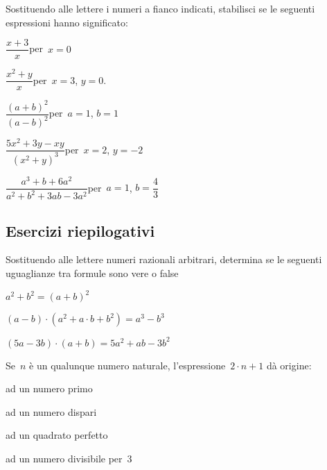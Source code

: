 \begin{esercizio}
 \label{ese:9.24}%
Sostituendo alle lettere i numeri a fianco indicati, stabilisci se le
seguenti espressioni hanno significato:
\TabPositions{8cm}
\begin{enumeratea}
\item $\dfrac{x+3}{x}$\quad per~$x=0$ \tab\boxSi\quad\boxNo
\item $\dfrac{x^{2}+y}{x}$\quad per~$x=3$, $y=0.$ \tab\boxSi\quad\boxNo
\item $\dfrac{(a+b)^{2}}{(a-b)^{2}}$\quad per~$a=1$, $b=1$ \tab\boxSi\quad\boxNo
\item $\dfrac{5x^{2}+3y-xy}{(x^{2}+y)^{3}}$\quad per~$x=2$, $y=-2$ \tab\boxSi\quad\boxNo
\item $\dfrac{a^{3}+b+6a^{2}}{a^{2}+b^{2}+3ab-3a^{2}}$\quad per~$a=1$, $b=\dfrac{4}{3}$ \tab\boxSi\quad\boxNo
\end{enumeratea}
\end{esercizio}

\subsection{Esercizi riepilogativi}

\begin{esercizio}
 \label{ese:9.25} %
 Sostituendo alle lettere numeri razionali
arbitrari, determina se le seguenti uguaglianze tra formule sono
vere o false
\TabPositions{8cm}
\begin{enumeratea}
 \item $a^{2}+b^{2}=(a+b)^{2}$ \tab\boxV\quad\boxF
 \item $(a-b)\cdot (a^{2}+a\cdot b+b^{2})=a^{3}-b^{3}$ \tab\boxV\quad\boxF
 \item $(5a-3b)\cdot (a+b)=5a^{2}+ab-3b^{2}$ \tab\boxV\quad\boxF
\end{enumeratea}
\end{esercizio}

\begin{esercizio}
 \label{ese:9.26} %
 Se~$n$ è un qualunque numero naturale,
l'espressione~$2\cdot n+1$ dà origine:
\begin{multicols}{2}
\boxA\quad ad un numero primo

\boxB\quad ad un numero dispari

\boxC\quad ad un quadrato perfetto

\boxD\quad ad un numero divisibile per~3
\end{multicols}
\end{esercizio}

